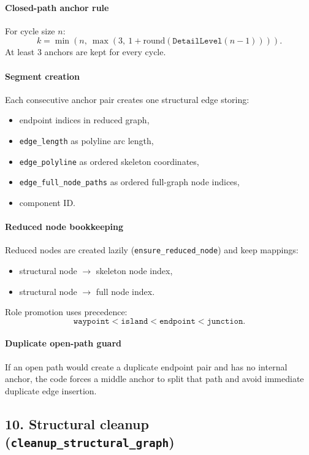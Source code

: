 \documentclass[11pt]{article}
\begin{document}
\paragraph{Closed-path anchor rule}
For cycle size \(n\):
\[
k=\min\left(n,\ \max\left(3,\ 1+\mathrm{round}(\texttt{DetailLevel}(n-1))\right)\right).
\]
At least 3 anchors are kept for every cycle.

\paragraph{Segment creation}
Each consecutive anchor pair creates one structural edge storing:
\begin{itemize}
  \item endpoint indices in reduced graph,
  \item \texttt{edge\_length} as polyline arc length,
  \item \texttt{edge\_polyline} as ordered skeleton coordinates,
  \item \texttt{edge\_full\_node\_paths} as ordered full-graph node indices,
  \item component ID.
\end{itemize}

\paragraph{Reduced node bookkeeping}
Reduced nodes are created lazily (\texttt{ensure\_reduced\_node}) and keep mappings:
\begin{itemize}
  \item structural node \(\rightarrow\) skeleton node index,
  \item structural node \(\rightarrow\) full node index.
\end{itemize}
Role promotion uses precedence:
\[
\texttt{waypoint} < \texttt{island} < \texttt{endpoint} < \texttt{junction}.
\]

\paragraph{Duplicate open-path guard}
If an open path would create a duplicate endpoint pair and has no internal anchor,
the code forces a middle anchor to split that path and avoid immediate duplicate edge insertion.

\subsection*{10. Structural cleanup (\texttt{cleanup\_structural\_graph})}
\end{document}
